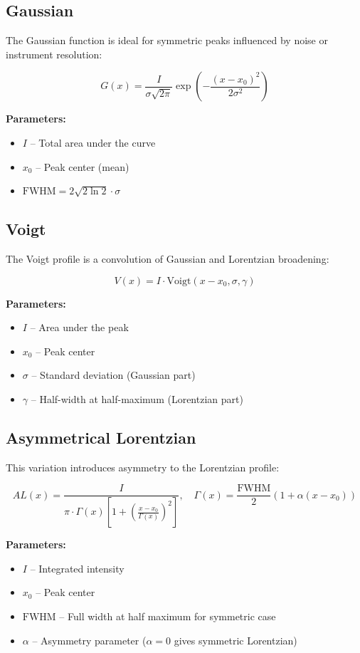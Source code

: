 \subsection{Gaussian}
The Gaussian function is ideal for symmetric peaks influenced by noise or instrument resolution:

\begin{equation}
G(x) = \frac{I}{\sigma \sqrt{2\pi}} \exp\left(-\frac{(x - x_0)^2}{2\sigma^2}\right)
\end{equation}

\textbf{Parameters:}
\begin{itemize}
\item $I$ – Total area under the curve
\item $x_0$ – Peak center (mean)
\item $\mathrm{FWHM} = 2\sqrt{2 \ln 2} \cdot \sigma$
\end{itemize}

\subsection{Voigt}
The Voigt profile is a convolution of Gaussian and Lorentzian broadening:

\begin{equation}
V(x) = I \cdot \mathrm{Voigt}(x - x_0, \sigma, \gamma)
\end{equation}

\textbf{Parameters:}
\begin{itemize}
\item $I$ – Area under the peak
\item $x_0$ – Peak center
\item $\sigma$ – Standard deviation (Gaussian part)
\item $\gamma$ – Half-width at half-maximum (Lorentzian part)
\end{itemize}

\subsection{Asymmetrical Lorentzian}
This variation introduces asymmetry to the Lorentzian profile:

\begin{equation}
AL(x) = \frac{I}{\pi \cdot \Gamma(x) \left[1 + \left(\frac{x - x_0}{\Gamma(x)}\right)^2 \right]}, \quad \Gamma(x) = \frac{\mathrm{FWHM}}{2} (1 + \alpha(x - x_0))
\end{equation}

\textbf{Parameters:}
\begin{itemize}
\item $I$ – Integrated intensity
\item $x_0$ – Peak center
\item $\mathrm{FWHM}$ – Full width at half maximum for symmetric case
\item $\alpha$ – Asymmetry parameter ($\alpha = 0$ gives symmetric Lorentzian)
\end{itemize}


